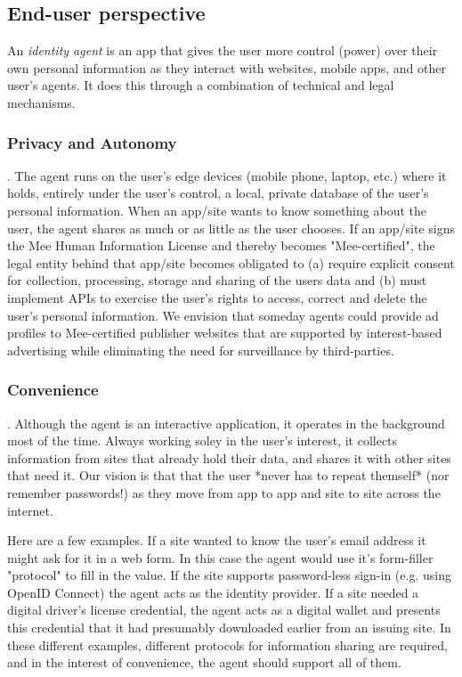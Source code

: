 \documentclass[11pt, oneside]{article}   	%
\begin{document}
\subsection{End-user perspective}
An \emph{identity agent} is an app that gives the user more control (power) over their own personal information as they interact with websites, mobile apps, and other user's agents. It does this through a combination of technical and legal mechanisms.

\subsubsection{Privacy and Autonomy}. 
The agent runs on the user's edge devices (mobile phone, laptop, etc.) where it holds, entirely under the user's control, a local, private database of the user's personal information. When an app/site wants to know something about the user, the agent shares as much or as little as the user chooses. If an app/site signs the Mee Human Information License and thereby becomes "Mee-certified", the legal entity behind that app/site becomes obligated to (a) require explicit consent for collection, processing, storage and sharing of the users data and (b) must implement APIs to exercise the user's rights to access, correct and delete the user's personal information. We envision that someday agents could provide ad profiles to Mee-certified publisher websites that are supported by interest-based advertising while eliminating the need for surveillance by third-parties.

\subsubsection{Convenience}. 
Although the agent is an interactive application, it operates in the background most of the time. Always working soley in the user's interest, it collects information from sites that already hold their data, and shares it with other sites that need it. Our vision is that that the user *never has to repeat themself* (nor remember passwords!) as they move from app to app and site to site across the internet.

Here are a few examples. If a site wanted to know the user's email address it might ask for it in a web form. In this case the agent would use it's form-filler "protocol" to fill in the value. If the site supports password-less sign-in (e.g. using OpenID Connect) the agent acts as the identity provider. If a site needed a digital driver's license credential, the agent acts as a digital wallet and presents this credential that it had presumably downloaded earlier from an issuing site. In these different examples, different protocols for information sharing are required, and in the interest of convenience, the agent should support all of them.
\end{document}

